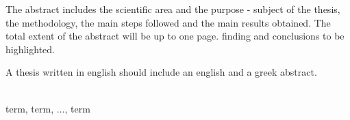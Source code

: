 
\begin{abstracteng}
The abstract includes the scientific area and the purpose - subject of the thesis, the methodology, the main steps followed and the main results obtained. The total extent of the abstract will be up to one page. finding and conclusions to be highlighted.

A thesis written in english should include an english and a greek abstract.

\vspace*{\fill}
\\ 
term, term, $\dots$, term
\end{abstracteng}